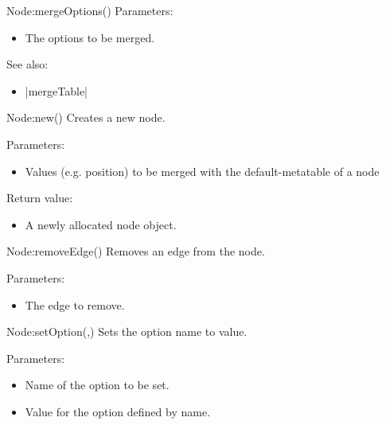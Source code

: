 \begin{luacommand}{{Node:mergeOptions}()}
Parameters:
\begin{itemize}
	\item[]  \subitem The options to be merged.
\end{itemize}



See also:
\begin{itemize}
	\item[] |mergeTable|
\end{itemize}

\end{luacommand}\begin{luacommand}{{Node:new}()}
Creates a new node.

Parameters:
\begin{itemize}
	\item[]  \subitem Values (e.g. position) to be merged with the default-metatable of a node
\end{itemize}


Return value:
\begin{itemize} \item[] A newly allocated node object. \end{itemize}


\end{luacommand}\begin{luacommand}{{Node:removeEdge}()}
Removes an edge from the node.

Parameters:
\begin{itemize}
	\item[]  \subitem The edge to remove.
\end{itemize}



\end{luacommand}\begin{luacommand}{{Node:setOption}(,)}
Sets the option name to value.

Parameters:
\begin{itemize}
	\item[]  \subitem Name of the option to be set.\item[]  \subitem Value for the option defined by name.
\end{itemize}



\end{luacommand}
